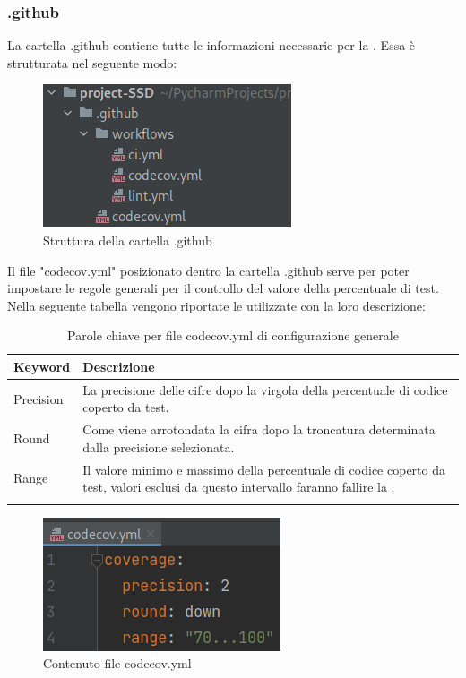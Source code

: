 \subsubsection{.github}
La cartella .github contiene tutte le informazioni necessarie per la . Essa è strutturata nel seguente modo:
\begin{figure}[H]
    \centering
    \includegraphics[scale = 0.5]{components/img/struttura-cartella-dotgithub.png}
    \caption{Struttura della cartella .github}
    \label{fig:Struttura della cartella .github}
\end{figure}
Il file "codecov.yml" posizionato dentro la cartella .github serve per poter impostare le regole generali per il controllo del valore della percentuale di test. Nella seguente tabella vengono riportate le  utilizzate con la loro descrizione:
{
	\setlength{\freewidth}{\dimexpr\textwidth-1\tabcolsep}
	\renewcommand{\arraystretch}{1.5}
	\setlength{\aboverulesep}{0pt}
	\setlength{\belowrulesep}{0pt}
	\begin{longtable}{L{.15\freewidth} L{.60\freewidth}}
		\textbf{Keyword} & \textbf{Descrizione}\\
		\toprule
		\endhead	
		Precision & La precisione delle cifre dopo la virgola della percentuale di codice coperto da test.\\
		Round & Come viene arrotondata la cifra dopo la troncatura determinata dalla precisione selezionata.\\
		Range & Il valore minimo e massimo della percentuale di codice coperto da test, valori esclusi da questo intervallo faranno fallire la . \\
		\bottomrule
		\hiderowcolors
		\caption{Parole chiave per file codecov.yml di configurazione generale}
	\end{longtable}
}
\begin{figure}[H]
    \centering
    \includegraphics[scale = 0.5]{components/img/contenuto-github-codecov.png}
    \caption{Contenuto file codecov.yml}
    \label{fig:Contenuto file codecov.yml}
\end{figure}  
